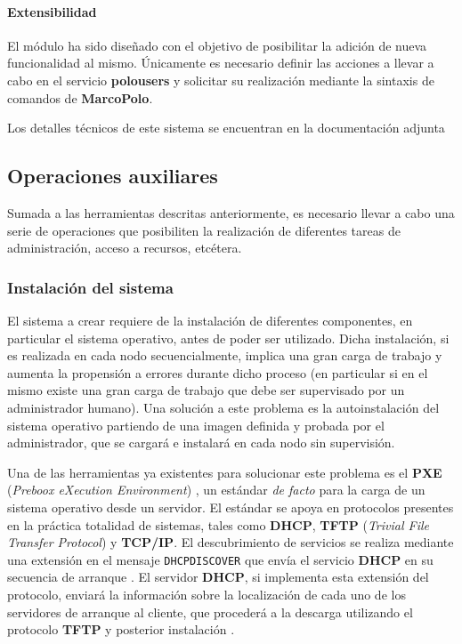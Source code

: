\paragraph{Extensibilidad\\}

El módulo ha sido diseñado con el objetivo de posibilitar la adición de nueva funcionalidad al mismo. Únicamente es necesario definir las acciones a llevar a cabo en el servicio \textbf{polousers} y solicitar su realización mediante la sintaxis de comandos de \textbf{MarcoPolo}.

\vspace{2cm}

Los detalles técnicos de este sistema se encuentran en la documentación adjunta \citationneeded[TODO]


\subsection{Operaciones auxiliares}

Sumada a las herramientas descritas anteriormente, es necesario llevar a cabo una serie de operaciones que posibiliten la realización de diferentes tareas de administración, acceso a recursos, etcétera.

\subsubsection{Instalación del sistema}

El sistema a crear requiere de la instalación de diferentes componentes, en particular el sistema operativo, antes de poder ser utilizado. Dicha instalación, si es realizada en cada nodo secuencialmente, implica una gran carga de trabajo y aumenta la propensión a errores durante dicho proceso (en particular si en el mismo existe una gran carga de trabajo que debe ser supervisado por un administrador humano). Una solución a este problema es la autoinstalación del sistema operativo partiendo de una imagen definida y probada por el administrador, que se cargará e instalará en cada nodo sin supervisión.

Una de las herramientas ya existentes para solucionar este problema es el \textbf{PXE} (\textit{Preboox eXecution Environment}) \cite{pxeintel}, un estándar \textit{de facto} \cite{avramov:architecture} para la carga de un sistema operativo desde un servidor. El estándar se apoya en protocolos presentes en la práctica totalidad de sistemas, tales como \textbf{DHCP}, \textbf{TFTP} (\textit{Trivial File Transfer Protocol}) y \textbf{TCP/IP}. El descubrimiento de servicios se realiza mediante una extensión en el mensaje \texttt{DHCPDISCOVER} que envía el servicio \textbf{DHCP} en su secuencia de arranque \cite{rfc4578}. El servidor \textbf{DHCP}, si implementa esta extensión del protocolo, enviará la información sobre la localización de cada uno de los servidores de arranque al cliente, que procederá a la descarga utilizando el protocolo \textbf{TFTP} y posterior instalación \cite{pxeoverview}.

